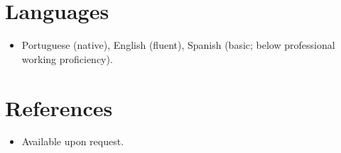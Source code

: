 \documentclass[11pt,a4paper,sans]{moderncv}
\begin{document}

\section{Languages}
\vspace{1pt}
\begin{itemize}
\item Portuguese (native), English (fluent), Spanish (basic; below professional working proficiency).
\end{itemize}


\section{References}
\vspace{1pt}
\begin{itemize}
\item{Available upon request.}
\end{itemize}
\end{document}
